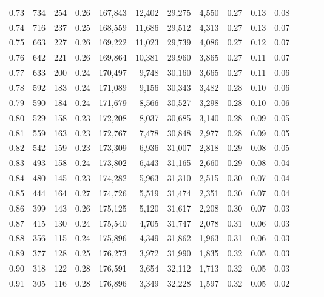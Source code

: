 \begin{tabular}{rrrrrrrrrrrrrr}
0.73 &    734 &  254 &  0.26 &  167,843 &   12,402 &  29,275 &   4,550 &  0.27 &  0.13 &      0.08 \\
0.74 &    716 &  237 &  0.25 &  168,559 &   11,686 &  29,512 &   4,313 &  0.27 &  0.13 &      0.07 \\
0.75 &    663 &  227 &  0.26 &  169,222 &   11,023 &  29,739 &   4,086 &  0.27 &  0.12 &      0.07 \\
0.76 &    642 &  221 &  0.26 &  169,864 &   10,381 &  29,960 &   3,865 &  0.27 &  0.11 &      0.07 \\
0.77 &    633 &  200 &  0.24 &  170,497 &    9,748 &  30,160 &   3,665 &  0.27 &  0.11 &      0.06 \\
0.78 &    592 &  183 &  0.24 &  171,089 &    9,156 &  30,343 &   3,482 &  0.28 &  0.10 &      0.06 \\
0.79 &    590 &  184 &  0.24 &  171,679 &    8,566 &  30,527 &   3,298 &  0.28 &  0.10 &      0.06 \\
0.80 &    529 &  158 &  0.23 &  172,208 &    8,037 &  30,685 &   3,140 &  0.28 &  0.09 &      0.05 \\
0.81 &    559 &  163 &  0.23 &  172,767 &    7,478 &  30,848 &   2,977 &  0.28 &  0.09 &      0.05 \\
0.82 &    542 &  159 &  0.23 &  173,309 &    6,936 &  31,007 &   2,818 &  0.29 &  0.08 &      0.05 \\
0.83 &    493 &  158 &  0.24 &  173,802 &    6,443 &  31,165 &   2,660 &  0.29 &  0.08 &      0.04 \\
0.84 &    480 &  145 &  0.23 &  174,282 &    5,963 &  31,310 &   2,515 &  0.30 &  0.07 &      0.04 \\
0.85 &    444 &  164 &  0.27 &  174,726 &    5,519 &  31,474 &   2,351 &  0.30 &  0.07 &      0.04 \\
0.86 &    399 &  143 &  0.26 &  175,125 &    5,120 &  31,617 &   2,208 &  0.30 &  0.07 &      0.03 \\
0.87 &    415 &  130 &  0.24 &  175,540 &    4,705 &  31,747 &   2,078 &  0.31 &  0.06 &      0.03 \\
0.88 &    356 &  115 &  0.24 &  175,896 &    4,349 &  31,862 &   1,963 &  0.31 &  0.06 &      0.03 \\
0.89 &    377 &  128 &  0.25 &  176,273 &    3,972 &  31,990 &   1,835 &  0.32 &  0.05 &      0.03 \\
0.90 &    318 &  122 &  0.28 &  176,591 &    3,654 &  32,112 &   1,713 &  0.32 &  0.05 &      0.03 \\
0.91 &    305 &  116 &  0.28 &  176,896 &    3,349 &  32,228 &   1,597 &  0.32 &  0.05 &      0.02 \\

\end{tabular}
